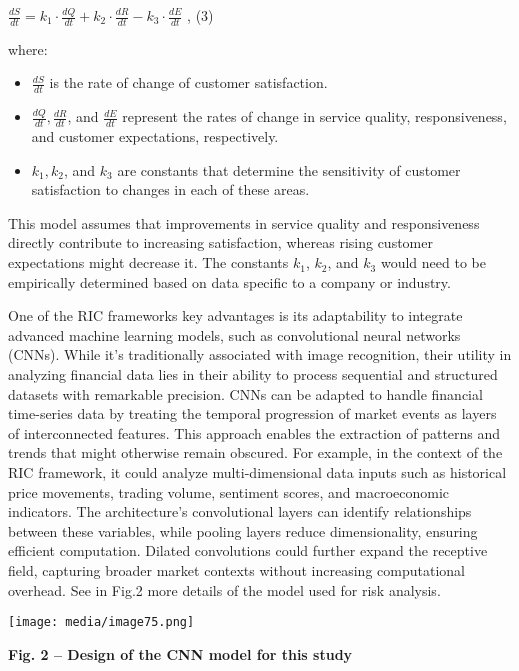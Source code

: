 \documentclass[
]{article}
\begin{document}
\(\frac{dS}{dt} = k_{1} \cdot \frac{dQ}{dt} + k_{2} \cdot \frac{dR}{dt} - k_{3} \cdot \frac{dE}{dt}\)
, (3)

where:

\begin{itemize}
\item
  \(\frac{dS}{dt}\) is the rate of change of customer satisfaction.
\item
  \(\frac{dQ}{dt},\frac{dR}{dt}\), and \(\frac{dE}{dt}\) represent the
  rates of change in service quality, responsiveness, and customer
  expectations, respectively.
\item
  \(k_{1},k_{2}\), and \(k_{3}\) are constants that determine the
  sensitivity of customer satisfaction to changes in each of these
  areas.
\end{itemize}

This model assumes that improvements in service quality and
responsiveness directly contribute to increasing satisfaction, whereas
rising customer expectations might decrease it. The constants \(k_{1}\),
\(k_{2}\), and \(k_{3}\) would need to be empirically determined based
on data specific to a company or industry.

One of the RIC framework\textquotesingle s key advantages is its
adaptability to integrate advanced machine learning models, such as
convolutional neural networks (CNNs). While it's traditionally
associated with image recognition, their utility in analyzing financial
data lies in their ability to process sequential and structured datasets
with remarkable precision. CNNs can be adapted to handle financial
time-series data by treating the temporal progression of market events
as layers of interconnected features. This approach enables the
extraction of patterns and trends that might otherwise remain obscured.
For example, in the context of the RIC framework, it could analyze
multi-dimensional data inputs such as historical price movements,
trading volume, sentiment scores, and macroeconomic indicators. The
architecture's convolutional layers can identify relationships between
these variables, while pooling layers reduce dimensionality, ensuring
efficient computation. Dilated convolutions could further expand the
receptive field, capturing broader market contexts without increasing
computational overhead. See in Fig.2 more details of the model used for
risk analysis.

\texttt{[image: media/image75.png]}

\textbf{Fig. 2 -- Design of the CNN model for this study}
\end{document}
